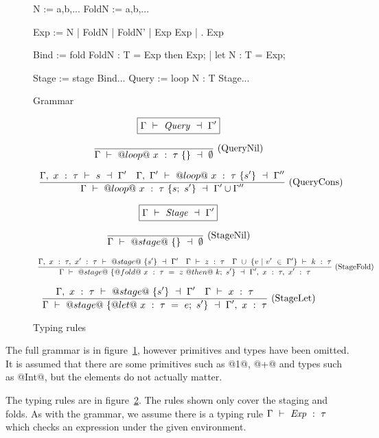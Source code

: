 \begin{figure}

\begin{code}
N     := a,b,...
FoldN := a,b,...

Exp   := N
       | FoldN  | FoldN'
       | Exp Exp
       | \N. Exp

Bind  := fold FoldN : T = Exp then Exp;
       | let  N     : T = Exp;

Stage := stage { Bind...  }
Query := loop N : T { Stage... }

\end{code}


\caption{Grammar}
\label{fig:grammar}
\end{figure}


\newcommand\TypecheckX[3]
{                   #1
        ~\vdash~    #2~:~#3
}

\newcommand\TypecheckS[3]
{                   #1
        ~\vdash~    #2~\dashv~#3
}


\begin{figure}

$$
\boxed{\TypecheckS{\Gamma}{\mi{Query}}{\Gamma'}}
$$

$$
\ruleAx
{
  \TypecheckS{\Gamma}{@loop@~x~:~\tau~\{\}}{\emptyset}
}{QueryNil}
$$

$$
\ruleIN
{
  \TypecheckS{\Gamma,~x~:~\tau}{s}{\Gamma'}
  \quad
  \TypecheckS{\Gamma,~\Gamma'}{@loop@~x~:~\tau~\{s'\}}{\Gamma''}
}{
  \TypecheckS{\Gamma}{@loop@~x~:~\tau~\{s;~s'\}}{\Gamma' \cup \Gamma''}
}{QueryCons}
$$



$$
\boxed{\TypecheckS{\Gamma}{\mi{Stage}}{\Gamma'}}
$$

$$
\ruleAx
{
  \TypecheckS{\Gamma}{@stage@~\{\}}{\emptyset}
}{StageNil}
$$

$$
\ruleIN
{
  \TypecheckS{\Gamma,~x~:~\tau,~x'~:~\tau}{@stage@~\{s'\}}{\Gamma'}
  \quad
  \TypecheckX{\Gamma}{z}{\tau}
  \quad
  \TypecheckX{\Gamma~\cup~\{v~|~v'~\in~\Gamma'\}}{k}{\tau}
}
{
  \TypecheckS{\Gamma}{@stage@~\{@fold@~x~:~\tau~=~z~@then@~k;~s'\}}{\Gamma',~x~:~\tau,~x'~:~\tau}
}{StageFold}
$$

$$
\ruleIN
{
  \TypecheckS{\Gamma,~x~:~\tau}{@stage@~\{s'\}}{\Gamma'}
  \quad
  \TypecheckX{\Gamma}{x}{\tau}
}
{
  \TypecheckS{\Gamma}{@stage@~\{@let@~x~:~\tau~=~e;~s'\}}{\Gamma',~x~:~\tau}
}{StageLet}
$$


\caption{Typing rules}
\label{fig:typing}
\end{figure}


The full grammar is in figure~\ref{fig:grammar}, however primitives and types have been omitted.
It is assumed that there are some primitives such as @1@, @+@ and types such as @Int@, but the elements do not actually matter.

The typing rules are in figure~\ref{fig:typing}.
The rules shown only cover the staging and folds.
As with the grammar, we assume there is a typing rule $\TypecheckX{\Gamma}{\mi{Exp}}{\tau}$ which checks an expression under the given environment.

